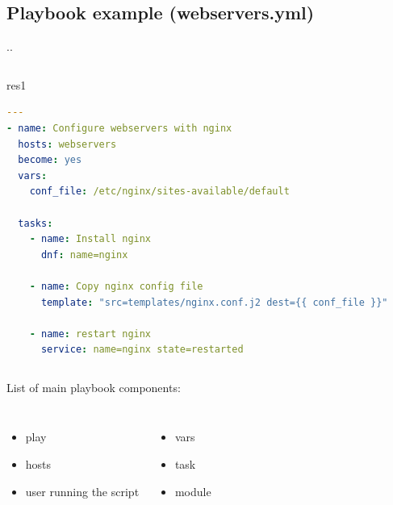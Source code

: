 \documentclass[pdf, 8pt, unicode, t]{beamer} %
\newcommand{\bluetext}[1]{{\usebeamercolor[fg]{bluetext_color}#1}}
\newcommand{\myinsertsubsection}{\alert{\Large\insertsectionnumber.\insertsubsectionnumber. \insertsubsection}\\}
\begin{document}
\subsection{Playbook example (webservers.yml)}
\begin{frame}[fragile, label=none]
%
\myinsertsubsection
%
%
\begin{columns}[t]
\begin{beamercolorbox}[sep=-1.0em,rounded=true,shadow=true,center]{res1}
\begin{lstlisting}[language=yaml]
---
- name: Configure webservers with nginx
  hosts: webservers
  become: yes
  vars:
    conf_file: /etc/nginx/sites-available/default

  tasks:
    - name: Install nginx
      dnf: name=nginx

    - name: Copy nginx config file
      template: "src=templates/nginx.conf.j2 dest={{ conf_file }}"

    - name: restart nginx
      service: name=nginx state=restarted
\end{lstlisting}
\end{beamercolorbox}
\end{columns}
\vspace{2em}
\bluetext{List of main playbook components:}
\begin{columns}[c,onlytextwidth]
\begin{itemize}
\item play
\item hosts
\item user running the script
\end{itemize}
\begin{itemize}
\item vars
\item task
\item module
\end{itemize}
\end{columns}
%

\end{frame}
\end{document}

